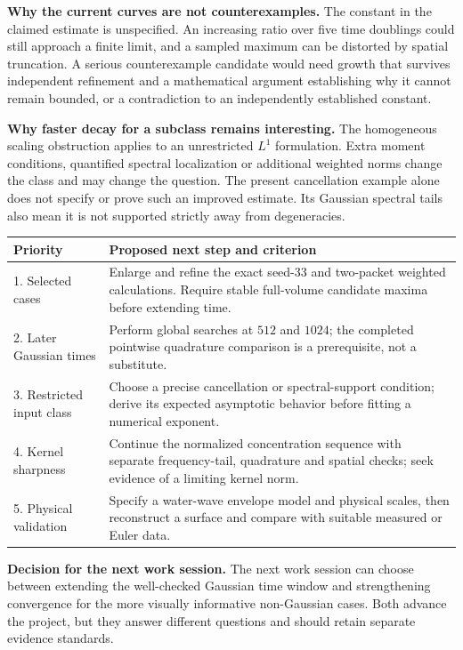 \documentclass[10pt,letterpaper]{article}
\numberwithin{equation}{section}
\newcommand{\callout}[1]{\par\medskip\noindent #1\par\medskip}
\begin{document}
\textbf{Why the current curves are not counterexamples.} The constant in the
claimed estimate is unspecified. An increasing ratio over five time doublings
could still approach a finite limit, and a sampled maximum can be distorted by
spatial truncation. A serious counterexample candidate would need growth that
survives independent refinement and a mathematical argument establishing why it
cannot remain bounded, or a contradiction to an independently established constant.

\textbf{Why faster decay for a subclass remains interesting.} The homogeneous
scaling obstruction applies to an unrestricted $L^1$ formulation. Extra moment
conditions, quantified spectral localization or additional weighted norms change
the class and may change the question. The present cancellation example alone
does not specify or prove such an improved estimate. Its Gaussian spectral tails
also mean it is not supported strictly away from degeneracies.

\begin{center}\begin{tabular}{p{.25\linewidth}p{.65\linewidth}}\toprule
Priority & Proposed next step and criterion\\\midrule
1. Selected cases & Enlarge and refine the exact seed-33 and two-packet weighted
calculations. Require stable full-volume candidate maxima before extending time.\\
2. Later Gaussian times & Perform global searches at $512$ and $1024$; the completed
pointwise quadrature comparison is a prerequisite, not a substitute.\\
3. Restricted input class & Choose a precise cancellation or spectral-support
condition; derive its expected asymptotic behavior before fitting a numerical exponent.\\
4. Kernel sharpness & Continue the normalized concentration sequence with separate
frequency-tail, quadrature and spatial checks; seek evidence of a limiting kernel norm.\\
5. Physical validation & Specify a water-wave envelope model and physical scales,
then reconstruct a surface and compare with suitable measured or Euler data.\\\bottomrule
\end{tabular}\end{center}
\callout{\textbf{Decision for the next work session.} The next work session can choose between extending the
well-checked Gaussian time window and strengthening convergence for the more
visually informative non-Gaussian cases. Both advance the project, but they answer
different questions and should retain separate evidence standards.}
\end{document}
